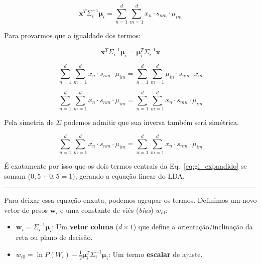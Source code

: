 \documentclass[12pt, a4paper]{article}
\begin{document}
\begin{equation*}
    \mathbf{x}^T \Sigma_i^{-1} \boldsymbol{\mu}_i  =
    \sum_{n=1}^d \sum_{m=1}^d
    x_{n} \cdot s_{n m} \cdot \mu_{i m}
\end{equation*}


Para provarmos que a igualdade dos termos:

\begin{equation*}
\mathbf{x}^T \Sigma_i^{-1} \boldsymbol{\mu}_i  = 
\boldsymbol{\mu}_i^T \Sigma_i^{-1} \mathbf{x}
\end{equation*}

\begin{equation*}
\sum_{n=1}^d \sum_{m=1}^d
x_{n} \cdot s_{n m} \cdot \mu_{i m}
=
\sum_{n=1}^d \sum_{m=1}^d
\mu_{i n} \cdot s_{n m} \cdot x_{m}
\end{equation*}

\begin{equation*}
\sum_{n=1}^d \sum_{m=1}^d
x_{n} \cdot s_{n m} \cdot \mu_{i m}
=
\sum_{n=1}^d \sum_{m=1}^d
x_{n} \cdot s_{m n} \cdot \mu_{i m}
\end{equation*}

Pela simetria de $\Sigma$ podemos admitir que sua inversa também será simétrica.

\begin{equation*}
\sum_{n=1}^d \sum_{m=1}^d
x_{n} \cdot s_{n m} \cdot \mu_{i m}
=
\sum_{n=1}^d \sum_{m=1}^d
x_{n} \cdot s_{n m} \cdot \mu_{i m}
\end{equation*}

\vspace{0.2cm}
É exatamente por isso que os dois termos centrais da Eq.~\eqref{eq:gi_expandido} se somam ($0{,}5 + 0{,}5 = 1$), gerando a equação linear do LDA.

\noindent\rule{\textwidth}{0.4pt}
\vspace{0.5cm}



Para deixar essa equação enxuta, podemos agrupar os termos. Definimos um novo vetor de pesos $\mathbf{w}_i$ e uma constante de viés (\textit{bias}) $w_{i0}$:
\begin{itemize}
    \item $\mathbf{w}_i = \Sigma_{i}^{-1}\boldsymbol{\mu}_i$: Um \textbf{vetor coluna} ($d \times 1$) que define a orientação/inclinação da reta ou plano de decisão.
    \item $w_{i0} = \ln P(W_i) - \tfrac{1}{2}\boldsymbol{\mu}_i^T\Sigma_{i}^{-1}\boldsymbol{\mu}_i $: Um termo \textbf{escalar} de ajuste.
\end{itemize}
\end{document}
